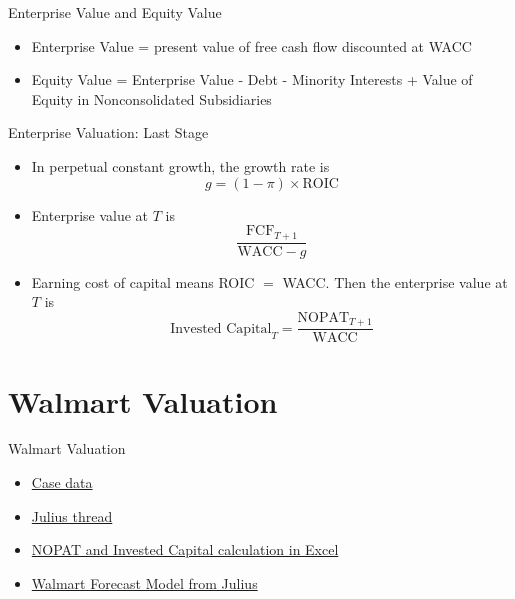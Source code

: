 \documentclass[10pt]{beamer}
\begin{document}
  \begin{frame}{Enterprise Value and Equity Value}
    \begin{itemize}
        \item Enterprise Value = present value of free cash flow discounted at WACC
        \item Equity Value = Enterprise Value - Debt - Minority Interests + Value of Equity in Nonconsolidated Subsidiaries
    \end{itemize}
    \end{frame}

    \begin{frame}{Enterprise Valuation: Last Stage}
        \begin{itemize}
         \item In perpetual constant growth, the growth rate is 
         $$g = (1-\pi) \times \text{ROIC}$$
         \item Enterprise value at $T$ is 
         $$\frac{\text{FCF}_{T+1}}{\text{WACC} - g}$$
        \item Earning cost of capital means ROIC $=$ WACC. Then the enterprise value at $T$ is 
        $$\text{Invested Capital}_T = \frac{\text{NOPAT}_{T+1}}{\text{WACC}}$$
        \end{itemize}
\end{frame}

\section{Walmart Valuation}

\begin{frame}{Walmart Valuation}
    \begin{itemize}
    \item \href{https://mgmt675-2025.kerryback.comassets/Walmart.xlsx}{Case data}
    \item \href{https://julius.ai/s/1eb08d2f-4f6e-4d5a-8787-5228da1d22bd}{Julius thread}
    \item \href{https://mgmt675-2025.kerryback.comassets/Walmart_NOPAT_IC.xlsx}{NOPAT and Invested Capital calculation in Excel}
    \item \href{https://mgmt675-2025.kerryback.com/assets/Walmart_Forecast_Model.xlsx}{Walmart Forecast Model from Julius}
    \end{itemize}
\end{frame}
\end{document}
